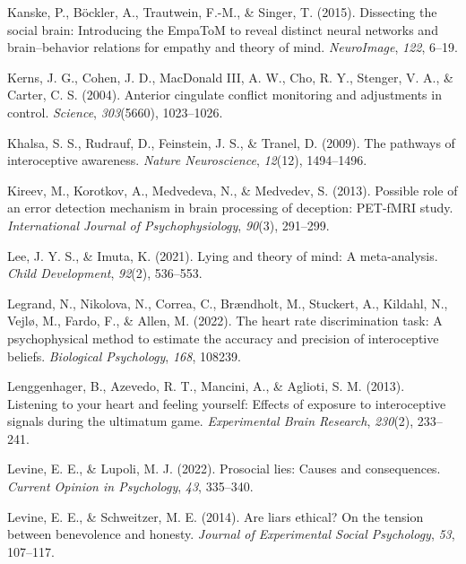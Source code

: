 \documentclass[
  man,mask,floatsintext]{apa6}
\newlength{\cslhangindent}
\newenvironment{CSLReferences}[2] %
 {\begin{list}{}{%
  \setlength{\itemindent}{0pt}
  \setlength{\leftmargin}{0pt}
  \setlength{\parsep}{0pt}
  \ifodd #1
   \setlength{\leftmargin}{\cslhangindent}
   \setlength{\itemindent}{-1\cslhangindent}
  \fi
  \setlength{\itemsep}{#2\baselineskip}}}
 {\end{list}}
\begin{document}
\begin{CSLReferences}{1}{0}
Kanske, P., Böckler, A., Trautwein, F.-M., \& Singer, T. (2015). Dissecting the social brain: Introducing the EmpaToM to reveal distinct neural networks and brain--behavior relations for empathy and theory of mind. \emph{NeuroImage}, \emph{122}, 6--19.

Kerns, J. G., Cohen, J. D., MacDonald III, A. W., Cho, R. Y., Stenger, V. A., \& Carter, C. S. (2004). Anterior cingulate conflict monitoring and adjustments in control. \emph{Science}, \emph{303}(5660), 1023--1026.

Khalsa, S. S., Rudrauf, D., Feinstein, J. S., \& Tranel, D. (2009). The pathways of interoceptive awareness. \emph{Nature Neuroscience}, \emph{12}(12), 1494--1496.

Kireev, M., Korotkov, A., Medvedeva, N., \& Medvedev, S. (2013). Possible role of an error detection mechanism in brain processing of deception: PET-fMRI study. \emph{International Journal of Psychophysiology}, \emph{90}(3), 291--299.

Lee, J. Y. S., \& Imuta, K. (2021). Lying and theory of mind: A meta-analysis. \emph{Child Development}, \emph{92}(2), 536--553.

Legrand, N., Nikolova, N., Correa, C., Brændholt, M., Stuckert, A., Kildahl, N., Vejlø, M., Fardo, F., \& Allen, M. (2022). The heart rate discrimination task: A psychophysical method to estimate the accuracy and precision of interoceptive beliefs. \emph{Biological Psychology}, \emph{168}, 108239.

Lenggenhager, B., Azevedo, R. T., Mancini, A., \& Aglioti, S. M. (2013). Listening to your heart and feeling yourself: Effects of exposure to interoceptive signals during the ultimatum game. \emph{Experimental Brain Research}, \emph{230}(2), 233--241.

Levine, E. E., \& Lupoli, M. J. (2022). Prosocial lies: Causes and consequences. \emph{Current Opinion in Psychology}, \emph{43}, 335--340.

Levine, E. E., \& Schweitzer, M. E. (2014). Are liars ethical? On the tension between benevolence and honesty. \emph{Journal of Experimental Social Psychology}, \emph{53}, 107--117.


\end{CSLReferences}
\end{document}
